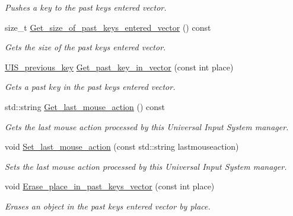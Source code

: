 \begin{DoxyCompactItemize}
\begin{DoxyCompactList}\small\item\em Pushes a key to the past keys entered vector. \end{DoxyCompactList}\item 
size\+\_\+t \hyperlink{classjetfuel_1_1control_1_1UIS__manager_ab16fc0fc549296bdf8de3964ec933fb8}{Get\+\_\+size\+\_\+of\+\_\+past\+\_\+keys\+\_\+entered\+\_\+vector} () const
\begin{DoxyCompactList}\small\item\em Gets the size of the past keys entered vector. \end{DoxyCompactList}\item 
\hyperlink{structjetfuel_1_1control_1_1UIS__previous__key}{U\+I\+S\+\_\+previous\+\_\+key} \hyperlink{classjetfuel_1_1control_1_1UIS__manager_ac7dc1ae00609d95ba770813d7cbe6846}{Get\+\_\+past\+\_\+key\+\_\+in\+\_\+vector} (const int place)
\begin{DoxyCompactList}\small\item\em Gets a past key in the past keys entered vector. \end{DoxyCompactList}\item 
std\+::string \hyperlink{classjetfuel_1_1control_1_1UIS__manager_aea5102734384250b5c4c45a4a9109a62}{Get\+\_\+last\+\_\+mouse\+\_\+action} () const
\begin{DoxyCompactList}\small\item\em Gets the last mouse action processed by this Universal Input System manager. \end{DoxyCompactList}\item 
void \hyperlink{classjetfuel_1_1control_1_1UIS__manager_aa9fc7545ca5bcc229567f86945e981cd}{Set\+\_\+last\+\_\+mouse\+\_\+action} (const std\+::string lastmouseaction)
\begin{DoxyCompactList}\small\item\em Sets the last mouse action processed by this Universal Input System manager. \end{DoxyCompactList}\item 
void \hyperlink{classjetfuel_1_1control_1_1UIS__manager_ac2df113cedc2e78b29426edcb23c5f24}{Erase\+\_\+place\+\_\+in\+\_\+past\+\_\+keys\+\_\+vector} (const int place)
\begin{DoxyCompactList}\small\item\em Erases an object in the past keys entered vector by place. \end{DoxyCompactList}\item 

\end{DoxyCompactItemize}
